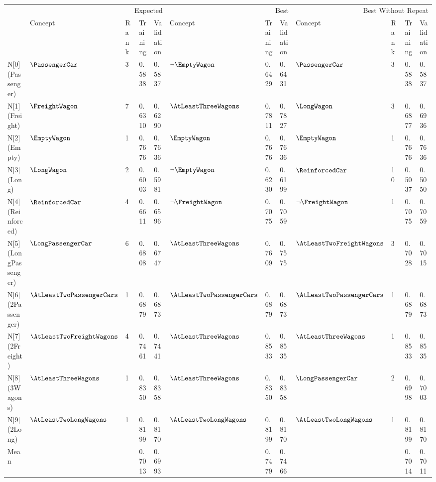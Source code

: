 \begin{tabular}{llllllllllll}
\toprule
 & \multicolumn{4}{r}{Expected} & \multicolumn{3}{r}{Best} & \multicolumn{4}{r}{Best Without Repeat} \\
 & Concept & Rank & Training & Validation & Concept & Training & Validation & Concept & Rank & Training & Validation \\
\midrule
N[0](Passenger) & $\PassengerCar$ & 3 & 0.5838 & 0.5837 & $\neg \EmptyWagon$ & 0.6429 & 0.6431 & $\PassengerCar$ & 3 & 0.5838 & 0.5837 \\
N[1](Freight) & $\FreightWagon$ & 7 & 0.6310 & 0.6290 & $\AtLeastThreeWagons$ & 0.7811 & 0.7827 & $\LongWagon$ & 3 & 0.6877 & 0.6936 \\
N[2](Empty) & $\EmptyWagon$ & 1 & 0.7676 & 0.7636 & $\EmptyWagon$ & 0.7676 & 0.7636 & $\EmptyWagon$ & 1 & 0.7676 & 0.7636 \\
N[3](Long) & $\LongWagon$ & 2 & 0.6003 & 0.5981 & $\neg \EmptyWagon$ & 0.6230 & 0.6199 & $\ReinforcedCar$ & 10 & 0.5037 & 0.5050 \\
N[4](Reinforced) & $\ReinforcedCar$ & 4 & 0.6611 & 0.6596 & $\neg \FreightWagon$ & 0.7075 & 0.7059 & $\neg \FreightWagon$ & 1 & 0.7075 & 0.7059 \\
N[5](LongPassenger) & $\LongPassengerCar$ & 6 & 0.6808 & 0.6747 & $\AtLeastThreeWagons$ & 0.7609 & 0.7575 & $\AtLeastTwoFreightWagons$ & 3 & 0.7028 & 0.7015 \\
N[6](2Passenger) & $\AtLeastTwoPassengerCars$ & 1 & 0.6879 & 0.6873 & $\AtLeastTwoPassengerCars$ & 0.6879 & 0.6873 & $\AtLeastTwoPassengerCars$ & 1 & 0.6879 & 0.6873 \\
N[7](2Freight) & $\AtLeastTwoFreightWagons$ & 4 & 0.7461 & 0.7441 & $\AtLeastThreeWagons$ & 0.8533 & 0.8535 & $\AtLeastThreeWagons$ & 1 & 0.8533 & 0.8535 \\
N[8](3Wagons) & $\AtLeastThreeWagons$ & 1 & 0.8350 & 0.8358 & $\AtLeastThreeWagons$ & 0.8350 & 0.8358 & $\LongPassengerCar$ & 2 & 0.6998 & 0.7003 \\
N[9](2Long) & $\AtLeastTwoLongWagons$ & 1 & 0.8199 & 0.8170 & $\AtLeastTwoLongWagons$ & 0.8199 & 0.8170 & $\AtLeastTwoLongWagons$ & 1 & 0.8199 & 0.8170 \\
Mean &  &  & 0.7013 & 0.6993 &  & 0.7479 & 0.7466 &  &  & 0.7014 & 0.7011 \\
\bottomrule
\end{tabular}
